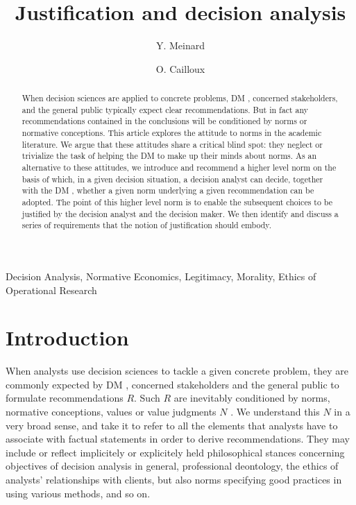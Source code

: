 \documentclass[preprint, french, english, 11pt, authoryear]{elsarticle}%
\begin{document}
\hypersetup{citecolor=black}
\title{Justification and decision analysis}

\author[ld]{Y. Meinard}
\author[ld]{O. Cailloux}
\address[ld]{Universit\'e Paris-Dauphine, PSL Research University, CNRS, UMR [7243], LAMSADE, 75016 PARIS, FRANCE}

\begin{abstract}
When decision sciences are applied to concrete problems, DM%
, concerned stakeholders, and the general public typically expect clear recommendations.
But in fact any recommendations contained in the conclusions will be conditioned by norms or normative conceptions.
This article explores the attitude to norms in the academic literature. We argue that these attitudes share a critical blind spot: they neglect or trivialize the task of helping the DM%
 to make up their minds about norms.
As an alternative to these attitudes, we introduce and recommend a higher level norm on the basis of which, in a given decision situation, a decision analyst can decide, together with the DM%
, whether a given norm underlying a given recommendation can be adopted.
The point of this higher level norm is to enable the subsequent choices to be justified by the decision analyst and the decision maker. We then identify and discuss a series of requirements that the notion of justification should embody.

\end{abstract}
\begin{keyword}
Decision Analysis, Normative Economics, Legitimacy, Morality, Ethics of Operational Research
\end{keyword}

\maketitle

\section{Introduction}
When analysts use decision sciences to tackle a given concrete problem, they are commonly expected by DM%
, concerned stakeholders and the general public to formulate recommendations $R$. 
Such $R$ are inevitably conditioned by norms, normative conceptions, values or value judgments $N$ \citep{funtowicz_science_1993,brans_ethics_2002,mingers_ethics_2011}.
We understand this $N$ in a very broad sense, and take it to refer to all the elements that analysts have to associate with factual statements in order to derive recommendations. 
They may include or reflect implicitely or explicitely held philosophical stances concerning objectives of decision analysis in general, professional deontology, the ethics of analysts' relationships with clients, but also norms specifying good practices in using various methods, and so on.
\end{document}
